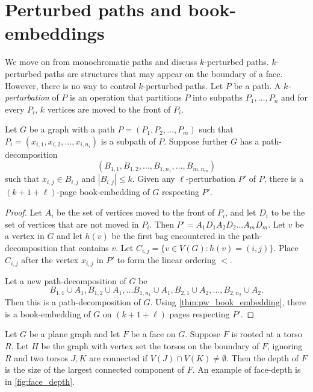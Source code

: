\section{Perturbed paths and book-embeddings}
We move on from monochromatic paths and discuss $k$-perturbed paths. $k$-perturbed paths are structures that may appear on the boundary of a face. However, there is no way to control $k$-perturbed paths. 
Let $P$ be a path. A \textit{$k$-perturbation} of $P$ is an operation that partitions $P$ into subpaths $P_1, \ldots, P_n$ and for every $P_i$, $k$ vertices are moved to the front of $P_i$. 

\begin{proposition}\label{prop:k-perturbation}
	Let $G$ be a graph with a path $P = (P_1, P_2, \ldots, P_m)$ such that $P_i = (x_{i,1}, x_{i,2}, \ldots, x_{i, n_{i}})$ is a subpath of $P$. Suppose further $G$ has a path-decomposition \[(B_{1,1}, B_{1,2}, \ldots, B_{1,n_{1}}, \ldots, B_{m, n_{m}})\] such that $x_{i,j} \in B_{i,j}$ and $|B_{i,j}| \leq k$. Given any $\ell$-perturbation $P'$ of $P$, there is a $(k + 1 + \ell)$-page book-embedding of $G$ respecting $P'$.
\end{proposition}

\begin{proof}
	Let $A_i$ be the set of vertices moved to the front of $P_i$, and let $D_i$ to be the set of vertices that are not moved in $P_i$. Then $P' = A_1 D_1 A_2 D_2 \ldots A_m D_m$. 
	Let $v$ be a vertex in $G$ and let $h(v)$ be the first bag encountered in the path-decomposition that contains $v$.
	Let $C_{i,j} = \{v \in V(G): h(v) = (i,j)\}$. Place $C_{i,j}$ after the vertex $x_{i,j}$ in $P'$ to form the linear ordering $<$.

	Let a new path-decomposition of $G$ be \[B_{1,1} \cup A_1, B_{1,2} \cup A_1, \ldots B_{1, n_1} \cup A_1, B_{2,1} \cup A_2, \ldots, B_{2,n_2} \cup A_2.\] Then this is a path-decomposition of $G$. Using \cref{thm:pw_book_embedding}, there is a book-embedding of $G$ on $(k + 1 + \ell)$ pages respecting $P'$. 

\end{proof}

Let $G$ be a plane graph and let $F$ be a face on $G$. Suppose $F$ is rooted at a torso $R$. Let $H$ be the graph with vertex set the torsos on the boundary of $F$, ignoring $R$ and two torsos $J, K$ are connected if $V(J) \cap V(K) \neq \emptyset$. Then the depth of $F$ is the size of the largest connected component of $F$. An example of face-depth is in \cref{fig:face_depth}.

